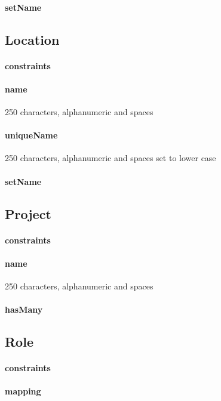 \documentclass[12pt]{article}
\begin{document}
\paragraph{setName}

\setcounter{paragraph}{0}
\subsection{Location}
\paragraph{constraints}
\paragraph{name} 250 characters, alphanumeric and spaces 
\paragraph{uniqueName} 250 characters, alphanumeric and spaces  set to lower case
\paragraph{setName}

\setcounter{paragraph}{0}
\subsection{Project}
\paragraph{constraints}
\paragraph{name} 250 characters, alphanumeric and spaces 
\paragraph{hasMany}

\setcounter{paragraph}{0}
\subsection{Role}
\paragraph{constraints}
\paragraph{mapping}
\end{document}

